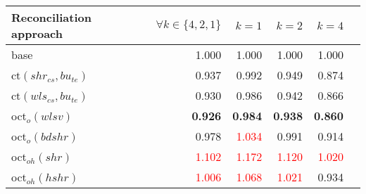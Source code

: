 \begin{tabular}[t]{lrrrrr}
 \toprule
  \textbf{Reconciliation approach}  & \textbf{$\forall k \in \{4,2,1\}$}  & \textbf{$k = 1$} & \textbf{$k=2$} & \textbf{$k=4$} \\
  \midrule
  base                     & {1.000}                 & {1.000}                 & {1.000}                 & {1.000} \\
  ct$(shr_{cs}, bu_{te})$  & {0.937}                 & {0.992}                 & {0.949}                 & {0.874}\\
  ct$(wls_{cs}, bu_{te})$  & {0.930}                 & {0.986}                 & {0.942}                 & {0.866}\\
  oct$_o(wlsv)$            & {\textbf{0.926}}        & {\textbf{0.984}}        & {\textbf{0.938}}        & {\textbf{0.860}} \\
  oct$_o(bdshr)$           & {0.978}                 & \textcolor{red}{1.034}  & {0.991}                 & {0.914} \\
  oct$_{oh}(shr)$          & \textcolor{red}{1.102}  & \textcolor{red}{1.172}  & \textcolor{red}{1.120}  & \textcolor{red}{1.020} \\
  oct$_{oh}(hshr)$         & \textcolor{red}{1.006}  & \textcolor{red}{1.068}  & \textcolor{red}{1.021}  & {0.934} \\
  \bottomrule
  \end{tabular}
